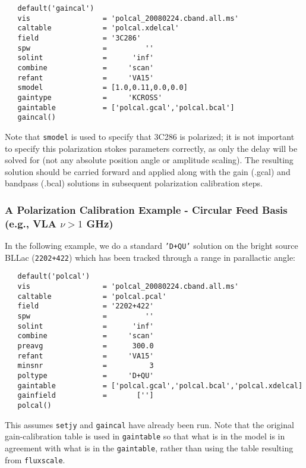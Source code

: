 \small
\begin{verbatim}
   default('gaincal')
   vis                 = 'polcal_20080224.cband.all.ms'
   caltable            = 'polcal.xdelcal'
   field               = '3C286'        
   spw                 =         ''        
   solint              =      'inf'    
   combine             =     'scan' 
   refant              =     'VA15'
   smodel              = [1.0,0.11,0.0,0.0]        
   gaintype            =     'KCROSS'        
   gaintable           = ['polcal.gcal','polcal.bcal']
   gaincal()
\end{verbatim}
\normalsize

Note that {\tt smodel} is used to specify that 3C286 is polarized; it is not
important to specify this polarization stokes parameters correctly, as only 
the delay will be solved for (not any absolute position angle or amplitude 
scaling).  The resulting solution should be carried forward and applied 
along with the gain (.gcal) and
bandpass (.bcal) solutions in subsequent polarization calibration steps.


\subsubsection{A Polarization Calibration Example - Circular Feed
  Basis (e.g., VLA $\nu>1$ GHz)}
\label{section:cal.solve.pol.example}

In the following example, we do a standard {\tt 'D+QU'} solution on
the bright source BLLac ({\tt 2202+422}) which has been tracked
through a range in parallactic angle:
\small
\begin{verbatim}
   default('polcal')
   vis                 = 'polcal_20080224.cband.all.ms'
   caltable            = 'polcal.pcal'
   field               = '2202+422'        
   spw                 =         ''        
   solint              =      'inf'    
   combine             =     'scan' 
   preavg              =      300.0        
   refant              =     'VA15'        
   minsnr              =          3        
   poltype             =     'D+QU'        
   gaintable           = ['polcal.gcal','polcal.bcal','polcal.xdelcal]
   gainfield           =       ['']
   polcal()
\end{verbatim}
\normalsize This assumes {\tt setjy} and {\tt gaincal} have already
been run.  Note that the original gain-calibration table is used in
{\tt gaintable} so that what is in the model is in agreement with what
is in the {\tt gaintable}, rather than using the table resulting from
{\tt fluxscale}.

